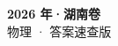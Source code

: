 \documentclass[zihao=-4, a4paper]{ctexart}
\begin{document}
\begin{center}
  {\Large\bfseries 2026 年·湖南卷}\\[4pt]
  {\large 物理 · 答案速查版}
\end{center}
\medskip
{}

\clearpage
{}

\end{document}
